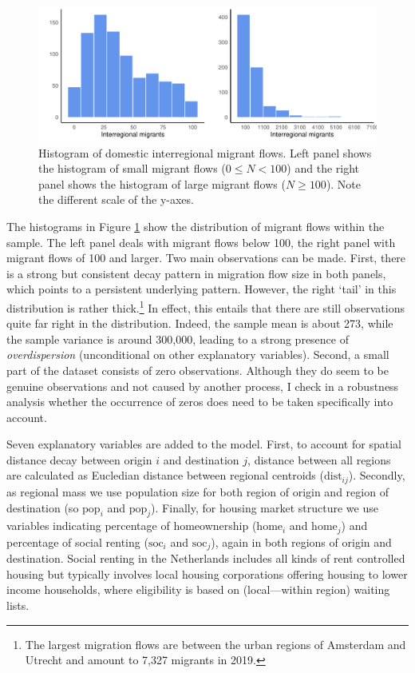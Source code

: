 \documentclass[11pt,parskip,abstracton,notitlepage, dvipsnames]{scrartcl}
\begin{document}
 \begin{figure}[ht]\centering 
\includegraphics[width=1.0\linewidth]{./../../fig/hist_mig_corop.pdf}
          \caption{Histogram of domestic interregional migrant flows. Left panel
shows the histogram of small migrant flows ($0 \leq N < 100$) and the right
panel shows the histogram of large migrant flows ($N \geq 100$). Note the
different scale of the y-axes.}
\label{fig:hist_mig_corop}
\end{figure}

The histograms in Figure \ref{fig:hist_mig_corop} show the distribution of
migrant flows within the sample. The left panel deals with migrant flows below
100, the right panel with migrant flows of 100 and larger. Two main observations
can be made. First, there is a strong but consistent decay pattern in migration
flow size in both panels, which points to a persistent underlying
pattern. However, the right `tail' in this distribution is rather
thick.\footnote{The largest migration flows are between the urban regions of
  Amsterdam and Utrecht and amount to 7,327 migrants in 2019.} In effect, this entails that there are
still observations quite far right in the distribution. Indeed, the sample mean
is about 273, while the sample variance is around 300,000, leading to a strong
presence of \emph{overdispersion} (unconditional on other explanatory
variables). Second, a small part of the dataset consists of zero
observations. Although they do seem to be genuine observations and not caused by
another process, I check in a robustness analysis whether the occurrence of
zeros does need to be taken specifically into account.

Seven explanatory variables are added to the model. First, to account for
spatial distance decay between origin $i$ and destination $j$, distance between
all regions are calculated as Eucledian distance between regional centroids
($\text{dist}_{ij}$). Secondly, as regional mass we use population size for
both region of origin and region of destination (so $\text{pop}_i$ and
$\text{pop}_j$). Finally, for housing market structure we use variables
indicating percentage of homeownership ($\text{home}_i$ and $\text{home}_j$) and
percentage of social renting ($\text{soc}_i$ and $\text{soc}_j$), again in both
regions of origin and destination. Social renting in the Netherlands includes all
kinds of rent controlled housing but typically involves local housing
corporations offering housing to lower income households, where eligibility is
based on (local---within region) waiting lists.
\end{document}
